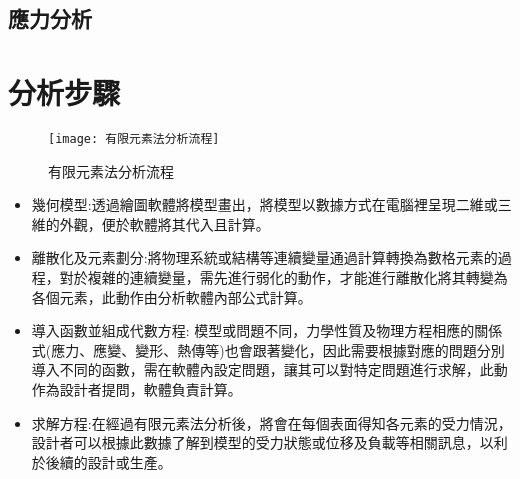 \subsection{應力分析}


\section{分析步驟}
\begin{figure}[hbt!]
\begin{center}
\texttt{[image: 有限元素法分析流程]}
\caption{\Large 有限元素法分析流程}\label{有限元素法分析流程}
\end{center}
\end{figure}
\begin{itemize}
\item 幾何模型:透過繪圖軟體將模型畫出，將模型以數據方式在電腦裡呈現二維或三維的外觀，便於軟體將其代入且計算。
\item 離散化及元素劃分:將物理系統或結構等連續變量通過計算轉換為數格元素的過程，對於複雜的連續變量，需先進行弱化的動作，才能進行離散化將其轉變為各個元素，此動作由分析軟體內部公式計算。
\item 導入函數並組成代數方程: 模型或問題不同，力學性質及物理方程相應的關係式(應力、應變、變形、熱傳等)也會跟著變化，因此需要根據對應的問題分別導入不同的函數，需在軟體內設定問題，讓其可以對特定問題進行求解，此動作為設計者提問，軟體負責計算。
\item 求解方程:在經過有限元素法分析後，將會在每個表面得知各元素的受力情況，設計者可以根據此數據了解到模型的受力狀態或位移及負載等相關訊息，以利於後續的設計或生產。
\end{itemize}
\newpage
